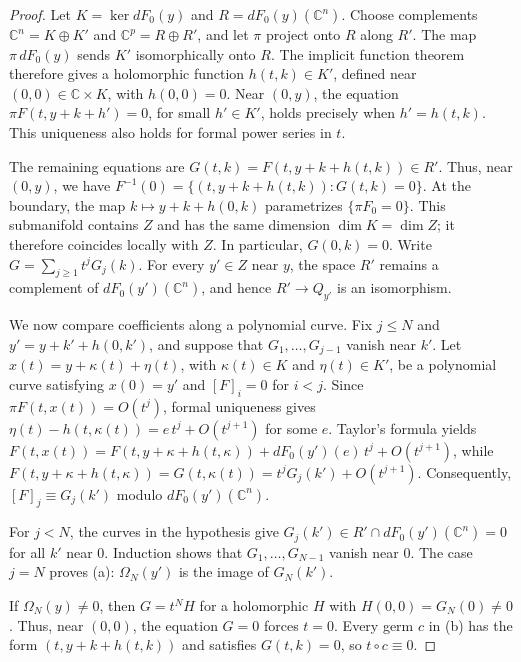 \documentclass[11pt]{amsart}
\theoremstyle{definition}
\theoremstyle{remark}
\newcommand{\C}{\mathbb{C}}
\begin{document}
\begin{proof}
{Let $K=\ker dF_0(y)$ and $R=dF_0(y)(\C^n)$.
Choose complements $\C^n=K\oplus K'$ and $\C^p=R\oplus R'$, and let $\pi$ project onto $R$
along $R'$. The map $\pi\,dF_0(y)$ sends $K'$ isomorphically onto $R$.
The implicit function theorem therefore gives a holomorphic function $h(t,k)\in K'$,
defined near $(0,0)\in\C\times K$, with $h(0,0)=0$.
Near $(0,y)$, the equation $\pi F(t,y+k+h')=0$, for small $h'\in K'$, holds precisely when
$h'=h(t,k)$. This uniqueness also holds for formal power series in $t$.

The remaining equations are $G(t,k)=F(t,y+k+h(t,k))\in R'$.
Thus, near $(0,y)$, we have $F^{-1}(0)=\{(t,y+k+h(t,k)):G(t,k)=0\}$.
At the boundary, the map $k\mapsto y+k+h(0,k)$ parametrizes $\{\pi F_0=0\}$.
This submanifold contains $Z$ and has the same dimension $\dim K=\dim Z$;
it therefore coincides locally with $Z$. In particular, $G(0,k)=0$.
Write $G=\sum_{j\ge1}t^jG_j(k)$.
For every $y'\in Z$ near $y$, the space $R'$ remains a complement of $dF_0(y')(\C^n)$,
and hence $R'\to Q_{y'}$ is an isomorphism.

We now compare coefficients along a polynomial curve.
Fix $j\le N$ and $y'=y+k'+h(0,k')$, and suppose that $G_1,\dots,G_{j-1}$ vanish near $k'$.
Let $x(t)=y+\kappa(t)+\eta(t)$, with $\kappa(t)\in K$ and $\eta(t)\in K'$,
be a polynomial curve satisfying $x(0)=y'$ and $[F]_i=0$ for $i<j$.
Since $\pi F(t,x(t))=O(t^j)$, formal uniqueness gives
$\eta(t)-h(t,\kappa(t))=e\,t^j+O(t^{j+1})$ for some $e$.
Taylor's formula yields $F(t,x(t))=F(t,y+\kappa+h(t,\kappa))+dF_0(y')(e)\,t^j+O(t^{j+1})$,
while $F(t,y+\kappa+h(t,\kappa))=G(t,\kappa(t))=t^jG_j(k')+O(t^{j+1})$.
Consequently, $[F]_j\equiv G_j(k')$ modulo $dF_0(y')(\C^n)$.

For $j<N$, the curves in the hypothesis give $G_j(k')\in R'\cap dF_0(y')(\C^n)=0$
for all $k'$ near $0$. Induction shows that $G_1,\dots,G_{N-1}$ vanish near $0$.
The case $j=N$ proves (a): $\Omega_N(y')$ is the image of $G_N(k')$.

If $\Omega_N(y)\ne0$, then $G=t^NH$ for a holomorphic $H$ with $H(0,0)=G_N(0)\ne0$.
Thus, near $(0,0)$, the equation $G=0$ forces $t=0$.
Every germ $c$ in (b) has the form $(t,y+k+h(t,k))$ and satisfies $G(t,k)=0$,
so $t\circ c\equiv0$.}
\end{proof}
\end{document}
